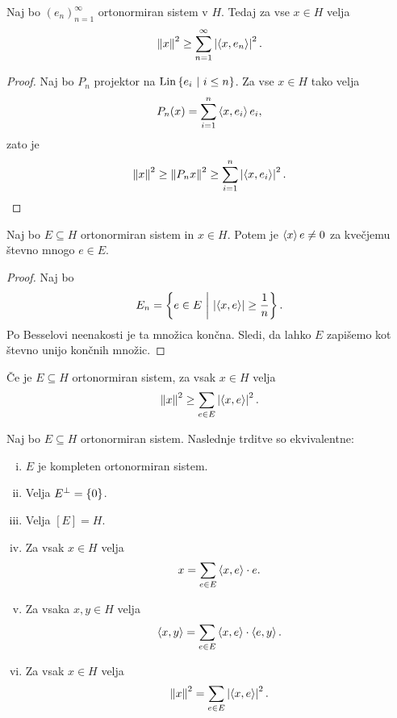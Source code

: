 
\begin{trditev}
Naj bo $(e_n)_{n=1}^\infty$ ortonormiran sistem v $H$. Tedaj za vse
$x \in H$ velja
\[
\left\lVert x\right\rVert^2 \geq \sum_{n=1}^\infty \left\lvert \left\langle x, e_n\right\rangle\right\rvert^2.
\]
\end{trditev}

\begin{proof}
Naj bo $P_n$ projektor na $\operatorname{Lin} \left\{e_i~\middle\vert~i \leq n\right\}$. Za vse
$x \in H$ tako velja
\[
P_n(x) = \sum_{i=1}^n \left\langle x, e_i\right\rangle e_i,
\]
zato je
\[
\left\lVert x\right\rVert^2 \geq \left\lVert P_n x\right\rVert^2 \geq
\sum_{i=1}^n \left\lvert \left\langle x, e_i\right\rangle\right\rvert^2. \qedhere
\]
\end{proof}

\begin{posledica}
Naj bo $E \subseteq H$ ortonormiran sistem in $x \in H$. Potem je
$\left\langle x\right\rangle{e} \ne 0$ za kvečjemu števno mnogo $e \in E$.
\end{posledica}

\begin{proof}
Naj bo
\[
E_n = \left\{e \in E~\middle\vert~\left\lvert \left\langle x,e\right\rangle\right\rvert \geq \frac{1}{n}\right\}.
\]
Po Besselovi neenakosti je ta množica končna. Sledi, da lahko $E$
zapišemo kot števno unijo končnih množic.
\end{proof}

\begin{posledica}
Če je $E \subseteq H$ ortonormiran sistem, za vsak $x \in H$ velja
\[
\left\lVert x\right\rVert^2 \geq \sum_{e \in E} \left\lvert \left\langle x,e\right\rangle\right\rvert^2.
\]
\end{posledica}

\obvs

\begin{izrek}
Naj bo $E \subseteq H$ ortonormiran sistem. Naslednje trditve so
ekvivalentne:

\begin{enumerate}[i)]
\item $E$ je kompleten ortonormiran sistem.
\item Velja $E^\bot = \left\{0\right\}$.
\item Velja $[E] = H$.
\item Za vsak $x \in H$ velja
\[
x = \sum_{e \in E} \left\langle x,e\right\rangle \cdot e.
\]
\item Za vsaka $x, y \in H$ velja
\[
\left\langle x,y\right\rangle = \sum_{e \in E} \left\langle x,e\right\rangle \cdot \left\langle e, y\right\rangle.
\]
\item Za vsak $x \in H$ velja
\[
\left\lVert x\right\rVert^2 = \sum_{e \in E} \left\lvert \left\langle x,e\right\rangle\right\rvert^2.
\]
\end{enumerate}
\end{izrek}

